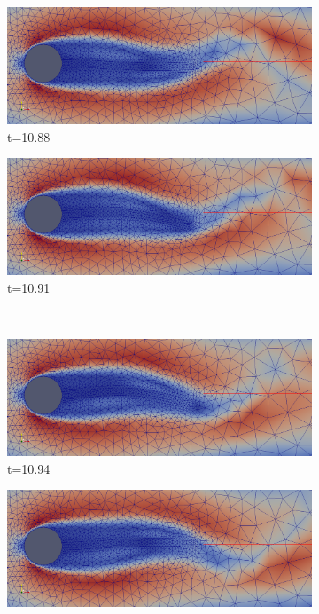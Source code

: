 \begin{center}
\begin{figure}[!ht]
\begin{subfigure}[b]{0.5\linewidth}
\includegraphics[width=\linewidth]{figures/FSI3/coarse/FSI_mesh_1}
\caption{t=10.88}
\end{subfigure}
\begin{subfigure}[b]{0.5\linewidth}
\includegraphics[width=\linewidth]{figures/FSI3/coarse/FSI_mesh_2}
\caption{t=10.91}
\end{subfigure} \\
\begin{subfigure}[b]{0.5\linewidth}
\includegraphics[width=\linewidth]{figures/FSI3/coarse/FSI_mesh_3}
\caption{t=10.94}
\end{subfigure}
\begin{subfigure}[b]{0.5\linewidth}
\includegraphics[width=\linewidth]{figures/FSI3/coarse/FSI_mesh_4}

\end{subfigure}
\end{figure}
\end{center}
